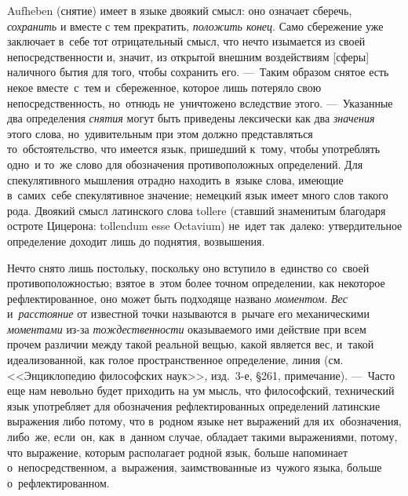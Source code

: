Aufheben (снятие) имеет в языке двоякий смысл: оно означает сберечь,
{\em сохранить} и вместе с тем прекратить,
{\em положить конец}. Само сбережение уже заключает в~себе
тот отрицательный смысл, что нечто изымается из своей
непосредственности и, значит, из открытой внешним воздействиям [сферы]
наличного бытия для того, чтобы сохранить его. ---~Таким образом снятое
есть некое вместе~с~тем и~сбереженное, которое лишь потеряло свою
непосредственность, но~отнюдь не~уничтожено вследствие этого.
---~Указанные два определения {\em снятия} могут быть приведены
лексически как два {\em значения} этого слова, но~удивительным
при этом должно представляться то~обстоятельство, что имеется
язык, пришедший к~тому, чтобы употреблять одно~и то~же слово для
обозначения противоположных определений. Для спекулятивного мышления
отрадно находить в~языке слова, имеющие в~самих~себе спекулятивное
значение; немецкий язык имеет много слов такого рода. Двоякий смысл
латинского слова tollere (ставший знаменитым благодаря остроте Цицерона:
tollendum esse Octavium)
не~идет так~далеко: утвердительное определение доходит лишь до поднятия,
возвышения.

Нечто снято лишь постольку, поскольку оно вступило в~единство со~своей
противоположностью; взятое в~этом более точном определении, как некоторое
рефлектированное, оно может быть подходяще названо
{\em моментом}. {\em Вес} и~{\em расстояние} от известной точки называются
в~рычаге его механическими {\em моментами} из-за
{\em тождественности} оказываемого ими действие при
всем прочем различии между такой реальной вещью, какой является вес,
и~такой идеализованной, как голое пространственное определение, линия
(см. <<Энциклопедию философских наук>>, изд.~3-е, \S 261, примечание).
---~Часто еще нам невольно будет приходить на ум мысль, что философский,
технический язык употребляет для обозначения рефлектированных
определений латинские выражения
либо потому, что в~родном языке нет выражений для их~обозначения, либо~же,
если~он, как~в~данном случае, обладает такими выражениями, потому, что
выражение, которым располагает родной язык, больше напоминает
о~непосредственном, а~выражения, заимствованные из~чужого языка,
больше о~рефлектированном.


